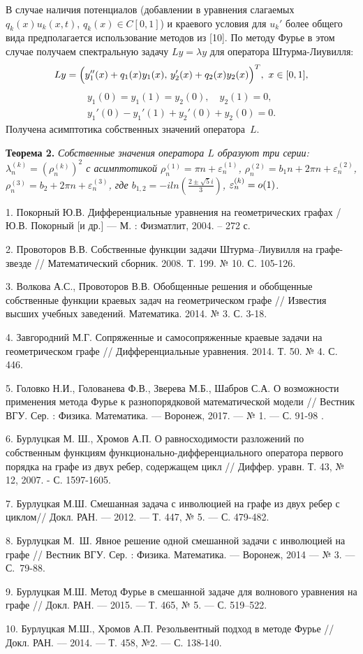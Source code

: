 В случае наличия потенциалов (добавлении в уравнения  слагаемых
$q_k(x)u_k(x,t)$, $q_k(x)\in C[0,1]$) и краевого условия для $u_k'$
более общего вида предполагается использование методов из [10]. По
методу Фурье в этом случае получаем спектральную задачу $Ly=\lambda
y$ для оператора Штурма-Лиувилля:
$$
    Ly=\Bigl(y_1''(x) + q_1(x) y_1(x), \,
    y_2'(x) +  q_2(x) y_2(x)\Bigl)^T,\   x\in [0,1], $$
    $$\begin{array}{c}
    y_1(0)=y_1(1)=y_2(0), \quad
    y_2(1)=0, \\
    y_1'(0) - y_1'(1) + y_2'(0) + y_2(0)=0.
    \end{array}
    $$
Получена асимптотика собственных значений   оператора~$L$.

    \textbf{Теорема 2.}
\textit{Собственные значения оператора $L$ образуют три серии:
$\lambda _n^{(k)}=(\rho_n^{(k)})^2$ с асимптотикой $\rho_n^{(1)}=\pi
n + \varepsilon_n^{(1)}$, $\rho_n^{(2)}=b_1 n + 2\pi n +
\varepsilon_n^{(2)}$, $\rho_n^{(3)}=b_2 + 2\pi n +
\varepsilon_n^{(3)}$,
    где $b _{1,2}=-i ln(\frac{2\pm\sqrt{5}i}{3})$, $\varepsilon_n^{(k)}=\tiny{o}(1)$.} \\


    \nopagebreak

1.  Покорный Ю.В. Дифференциальные уравнения на геометрических
графах / Ю.В. Покорный [и др.] --- М. : Физматлит, 2004. -- 272 с.

2.  Провоторов В.В. Собственные функции задачи Штурма–Лиувилля на
графе-звезде // Математический сборник. 2008. Т. 199. № 10. С.
105-126.

3.  Волкова А.С., Провоторов В.В. Обобщенные решения и обобщенные
собственные функции краевых задач на геометрическом графе  //
Известия высших учебных заведений. Математика. 2014. № 3. С. 3-18.

4. Завгородний М.Г. Сопряженные и самосопряженные краевые задачи на
геометрическом графе   //
 Дифференциальные уравнения. 2014. Т. 50. № 4. С.
446.

5. Головко Н.И., Голованева Ф.В., Зверева М.Б., Шабров С.А. О
возможности применения метода Фурье к разнопорядковой математической
модели // Вестник ВГУ. Сер. :  Физика. Математика. --- Воронеж,
2017. --- № 1. --- С. 91-98 .

6.  Бурлуцкая М. Ш., Хромов  А.П.  О равносходимости разложений по
собственным функциям функционально-диф\-фе\-рен\-циаль\-ного
оператора первого порядка на  графе из двух ребер,  содержащем  цикл
// Диффер. уравн. Т. 43, №  12,  2007. - С. 1597-1605.

7. Бурлуцкая М.Ш. Смешанная задача с инволюцией на графе  из двух
ребер с циклом// Докл. РАН. --- 2012. --- Т. 447, № 5. --- С.
479-482.

8. Бурлуцкая М.~Ш.  Явное решение одной смешанной задачи с
 инволюцией на графе  // Вестник ВГУ.  Сер. : Физика. Математика. --- Воронеж, 2014 ---  № 3.
    --- С.~79-88.

9.  Бурлуцкая М.Ш. Метод Фурье в смешанной задаче для волнового
уравнения на графе   // Докл. РАН. --- 2015. --- Т. 465, № 5. --- С.
519–522.

10.  Бурлуцкая М.Ш., Хромов А.П. Резольвентный подход в методе Фурье
  // Докл. РАН. --– 2014. --- Т. 458, №2.
--- С. 138-140.
